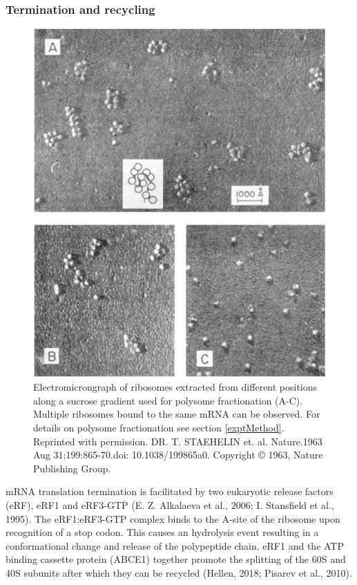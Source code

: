 \documentclass[12pt,openany]{book}
\begin{document}
\subsubsection{Termination and recycling}\begin{figure}
  \includegraphics{./figures/polysome.pdf}
  \caption{Electromicrongraph of ribosomes extracted from different positions along a sucrose gradient used for polysome fractionation (A-C). Multiple ribosomes bound to the same mRNA can be observed. For details on polysome fractionation see section \ref{exptMethod}. Reprinted with permission. DR. T. STAEHELIN et. al. Nature.1963 Aug 31;199:865-70.doi: 10.1038/199865a0. Copyright © 1963, Nature Publishing Group.
 \label{fig:polysomes}}
\end{figure}

mRNA translation termination is facilitated by two eukaryotic release
factors (eRF), eRF1 and eRF3-GTP (E. Z. Alkalaeva et al., 2006; I.
Stansfield et al., 1995). The eRF1:eRF3-GTP complex binds to the A-site
of the ribosome upon recognition of a stop codon. This causes an
hydrolysis event resulting in a conformational change and release of the
polypeptide chain. eRF1 and the ATP binding cassette protein (ABCE1)
together promote the splitting of the 60S and 40S subunits after which
they can be recycled (Hellen, 2018; Pisarev et al., 2010).
\end{document}
